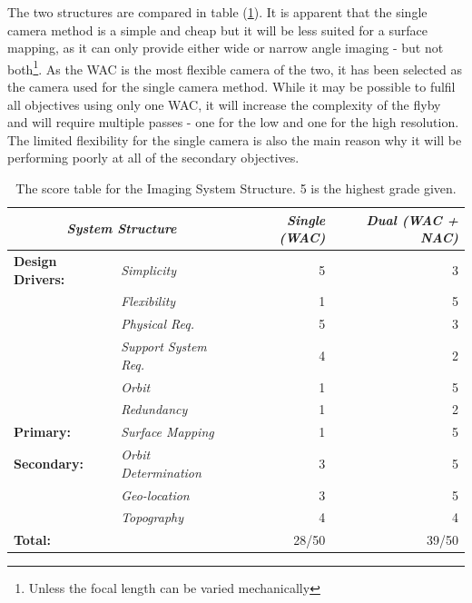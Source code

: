 The two structures are compared in table (\ref{tab:score_system_structure}). It is apparent that the single camera method is a simple and cheap but it will be less suited for a surface mapping, as it can only provide either wide or narrow angle imaging - but not both\footnote{Unless the focal length can be varied mechanically}. As the WAC is the most flexible camera of the two, it has been selected as the camera used for the single camera method. While it may be possible to fulfil all objectives using only one WAC, it will increase the complexity of the flyby and will require multiple passes - one for the low and one for the high resolution. The limited flexibility for the single camera is also the main reason why it will be performing poorly at all of the secondary objectives.
\begin{table}[htb!]
  \centering
    \begin{tabular}{l|l|rr|}
    \multicolumn{2}{c|}{\textit{\textbf{System Structure}}} & \textit{Single (WAC)} & \textit{Dual (WAC + NAC)} \bigstrut[b]\\
    \hline
    \textbf{Design Drivers:} & \textit{Simplicity} & 5     & 3 \bigstrut[t]\\
          & \textit{Flexibility} & 1     & 5 \\
          & \textit{Physical Req.} & 5     & 3 \\
          & \textit{Support System Req.} & 4     & 2 \\
          & \textit{Orbit} & 1     & 5 \\
          & \textit{Redundancy} & 1     & 2 \bigstrut[b]\\
    \hline
    \textbf{Primary:} & \textit{Surface Mapping} & 1     & 5 \bigstrut\\
    \hline
    \textbf{Secondary:} & \textit{Orbit Determination} & 3     & 5 \bigstrut[t]\\
          & \textit{Geo-location} & 3     & 5 \\
          & \textit{Topography} & 4     & 4 \bigstrut[b]\\
    \hline
    \multicolumn{1}{l}{\textbf{Total:}} & \textit{\textbf{}} & 28/50 & 39/50 \bigstrut[t]\\
    \end{tabular}%
  \caption{The score table for the Imaging System Structure. 5 is the highest grade given.}
  \label{tab:score_system_structure}%
\end{table}%

